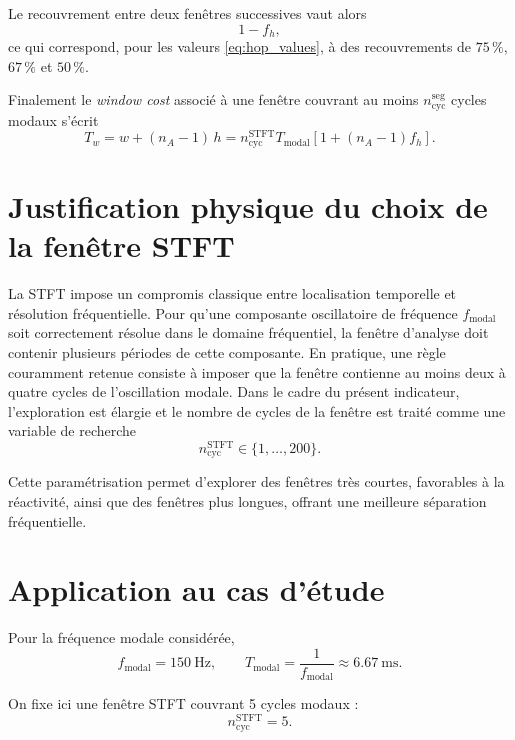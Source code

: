 \documentclass[12pt,a4paper, openany]{book}
\begin{document}
Le recouvrement entre deux fenêtres successives vaut alors
\begin{equation}
1-f_h,
\end{equation}
ce qui correspond, pour les valeurs \eqref{eq:hop_values}, à des recouvrements de $75\,\%$, $67\,\%$ et $50\,\%$.
\medskip

Finalement le \textit{window cost} associé à une fenêtre couvrant au moins $n_{\mathrm{cyc}}^{\mathrm{seg}}$ cycles modaux s'écrit
\begin{equation}
    T_w = w + (n_A-1)\,h
    = n_{\mathrm{cyc}}^{\mathrm{STFT}}T_{\mathrm{modal}}
      \left[1+(n_A-1)f_h\right].
      \label{eq:sst_window_cost_n_cyc}
\end{equation}

\section{Justification physique du choix de la fenêtre STFT}

La STFT impose un compromis classique entre localisation temporelle et résolution fréquentielle. Pour qu'une composante oscillatoire de fréquence $f_{\mathrm{modal}}$ soit correctement résolue dans le domaine fréquentiel, la fenêtre d'analyse doit contenir plusieurs périodes de cette composante. En pratique, une règle couramment retenue consiste à imposer que la fenêtre contienne au moins deux à quatre cycles de l'oscillation modale. Dans le cadre du présent indicateur, l'exploration est élargie et le nombre de cycles de la fenêtre est traité comme une variable de recherche
\begin{equation}
n_{\mathrm{cyc}}^{\mathrm{STFT}} \in \{1,\dots,200\}.
\end{equation}

Cette paramétrisation permet d'explorer des fenêtres très courtes, favorables à la réactivité, ainsi que des fenêtres plus longues, offrant une meilleure séparation fréquentielle.

\section{Application au cas d'étude}

Pour la fréquence modale considérée,
\begin{equation}
f_{\mathrm{modal}} = 150~\mathrm{Hz},
\qquad
T_{\mathrm{modal}}=\frac{1}{f_{\mathrm{modal}}}
\approx 6.67~\mathrm{ms}.
\end{equation}

On fixe ici une fenêtre STFT couvrant 5 cycles modaux :
\begin{equation}
n_{\mathrm{cyc}}^{\mathrm{STFT}}=5.
\end{equation}
\end{document}
